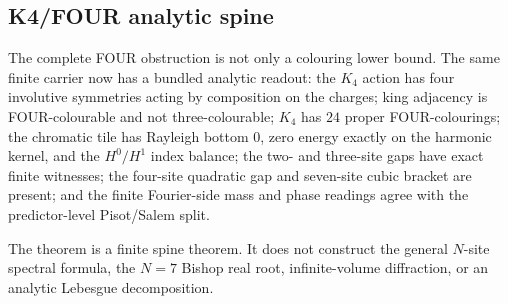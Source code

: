 \subsection{K4/FOUR analytic spine}

\begin{theorem}\label{thm:k4-four-analytic-spine}\leanok{}
The complete FOUR obstruction is not only a colouring lower bound.  The same
finite carrier now has a bundled analytic readout: the \(K_4\) action has four
involutive symmetries acting by composition on the charges; king adjacency is
FOUR-colourable and not three-colourable; \(K_4\) has \(24\) proper
FOUR-colourings; the chromatic tile has Rayleigh bottom \(0\), zero energy
exactly on the harmonic kernel, and the \(H^0/H^1\) index balance; the two- and
three-site gaps have exact finite witnesses; the four-site quadratic gap and
seven-site cubic bracket are present; and the finite Fourier-side mass and
phase readings agree with the predictor-level Pisot/Salem split.

The theorem is a finite spine theorem.  It does not construct the general
\(N\)-site spectral formula, the \(N=7\) Bishop real root, infinite-volume
diffraction, or an analytic Lebesgue decomposition.
\end{theorem}
